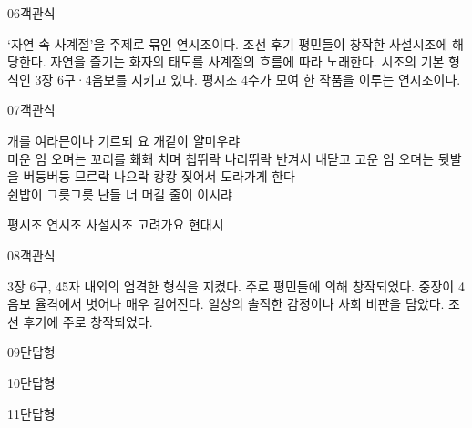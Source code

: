 \documentclass[fs85,seriesRus]{korfarm-base}
\begin{document}
\begin{kfQBlock}{06}{객관식}
\begin{kfChoices}
\kfChoice ‘자연 속 사계절’을 주제로 묶인 연시조이다.
\kfChoice 조선 후기 평민들이 창작한 사설시조에 해당한다.
\kfChoice 자연을 즐기는 화자의 태도를 사계절의 흐름에 따라 노래한다.
\kfChoice 시조의 기본 형식인 3장 6구·4음보를 지키고 있다.
\kfChoice 평시조 4수가 모여 한 작품을 이루는 연시조이다.
\end{kfChoices}
\end{kfQBlock}
\begin{kfQBlock}{07}{객관식}
\begin{kfEvidence}개를 여라믄이나 기르되 요 개같이 얄미우랴 \\\relax
미운 임 오며는 꼬리를 홰홰 치며 칩뛰락 나리뛰락 반겨서 내닫고 고운 임 오며는 뒷발을 버둥버둥 므르락 나으락 캉캉 짖어서 도라가게 한다 \\\relax
쉰밥이 그릇그릇 난들 너 머길 줄이 이시랴\end{kfEvidence}
\begin{kfChoices}
\kfChoice 평시조
\kfChoice 연시조
\kfChoice 사설시조
\kfChoice 고려가요
\kfChoice 현대시
\end{kfChoices}
\end{kfQBlock}
\begin{kfQBlock}{08}{객관식}
\begin{kfChoices}
\kfChoice 3장 6구, 45자 내외의 엄격한 형식을 지켰다.
\kfChoice 주로 평민들에 의해 창작되었다.
\kfChoice 중장이 4음보 율격에서 벗어나 매우 길어진다.
\kfChoice 일상의 솔직한 감정이나 사회 비판을 담았다.
\kfChoice 조선 후기에 주로 창작되었다.
\end{kfChoices}
\end{kfQBlock}
\begin{kfQBlock}{09}{단답형}
\end{kfQBlock}
\begin{kfQBlock}{10}{단답형}
\end{kfQBlock}
\begin{kfQBlock}{11}{단답형}
\end{kfQBlock}
\end{document}
